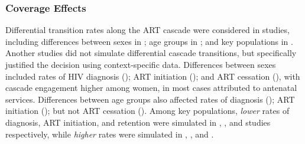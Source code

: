 \subsubsection{Coverage Effects}
\label{sss:res:cov}
Differential transition rates along the ART cascade were considered in
 studies, including differences between
sexes in ;
age groups in ; and
key populations in .
Another  studies did not simulate differential cascade transitions,
but specifically justified the decision using context-specific data.
Differences between sexes included rates of
HIV diagnosis ();
ART initiation (); and
ART cessation (),
with cascade engagement higher among women,
in most cases attributed to antenatal services.
Differences between age groups also affected
rates of diagnosis ();
ART initiation ();
but not ART cessation (). %
Among key populations, \emph{lower} rates of
diagnosis, ART initiation, and retention were simulated in
, , and 
studies respectively, while \emph{higher} rates were simulated in
, , and .
